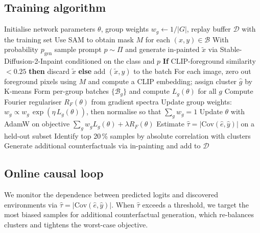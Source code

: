 \documentclass{article}
\begin{document}
\subsection{Training algorithm}
\begin{algorithm}[H]
  \caption{DiCE: Diffusion-based Counterfactual Environments with GC-DRO and Fourier penalty}
  \begin{algorithmic}[1]
    \State Initialise network parameters $\theta$, group weights $w_g \leftarrow 1/|G|$, replay buffer $\mathcal D$ with the training set
        \State Use SAM to obtain mask $M$ for each $(x,y) \in \mathcal B$
        \State With probability $p_{\text{gen}}$ sample prompt $p \sim \Pi$ and generate in-painted $\tilde x$ via Stable-Diffusion-2-Inpaint conditioned on the class and $p$
        \State \textbf{If} CLIP-foreground similarity $<0.25$ \textbf{then} discard $\tilde x$ \textbf{else} add $(\tilde x,y)$ to the batch
        \State For each image, zero out foreground pixels using $M$ and compute a CLIP embedding; assign cluster $\hat g$ by K-means
        \State Form per-group batches $\{\mathcal B_g\}$ and compute $L_g(\theta)$ for all $g$
        \State Compute Fourier regulariser $R_F(\theta)$ from gradient spectra
        \State Update group weights: $w_g \propto w_g\, \exp(\eta\, L_g(\theta))$, then normalise so that $\sum_g w_g = 1$
        \State Update $\theta$ with AdamW on objective $\sum_g w_g L_g(\theta) + \lambda R_F(\theta)$
      \EndFor
        \State Estimate $\hat{\tau} = |\mathrm{Cov}(\hat e, \hat y)|$ on a held-out subset
          \State Identify top 20\,\% samples by absolute correlation with clusters
          \State Generate additional counterfactuals via in-painting and add to $\mathcal D$
        \EndIf
      \EndIf
    \EndFor
  \end{algorithmic}
\end{algorithm}

\subsection{Online causal loop}
We monitor the dependence between predicted logits and discovered environments via $\hat{\tau} = |\mathrm{Cov}(\hat e, \hat y)|$. When $\hat{\tau}$ exceeds a threshold, we target the most biased samples for additional counterfactual generation, which re-balances clusters and tightens the worst-case objective.
\end{document}
